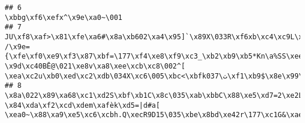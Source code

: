 \documentclass[
]{article}
\begin{document}
\begin{verbatim}
## 6                                                                                                                                                                                                                                                                                                                                                                                                                                                                                                                                                                                                                                                                                                                                                                                                                                                                                \xbbg\xf6\xefx^\x9e\xa0~\001
## 7                                                                                                                                                                                                                                                                                                              JU\xf8\xaf>\x81\xfe\xa6#\x8a\xb602\xa4\x95]`\x89X\033R\xf6xb\xc4\xc9L\xb6\xfc+\xa0\xd57 /\x9e={\xfe\xf0\xe9\xf3\x87\xbf=\177\xf4\xe8\xf9\xc3_\xb2\xb9\xb5*Kn\a%SS\xeeՏ_\xff\xfd\xfd\027\xde_\xbf\xfe\xf0\xea\xf17\xe9\xd4'\xf1\xc2Ŀ\xfc\xf9˗\xbf\xff\xf1:\xf5\xb0\xe2\xdc\025/\xbe}\xf2\xf2\xe9\x93\027\xdf}\xf5\xe7O\x8f\035\xda\xdb\034\035\x98\xf0!\x89\xb1\xf0\xae\xe1c\xef&\x8ba\x81\016\xfb\xf1\001?\x9d\xc40BĒ@\021\xe8v\xa8\xee\xcb\xc8\002^[ \xea\xc2u\xb0\xed\xc2\xdb\034X\xc6\005\xbc<\xbfkٺ\037\xf1\xb9$\x8e\x99\xafF\xb1\005\xdcc\x8cv\030w:ચ\xcb\xf0\xf0p\x9eLݓ󹉻\x89Бk\xee.J\xac
## 8                                                                                                                                                                                                                                                                                                                                                                                                                                                                                                                                                                                                                                       \x8a\022\x89\xa68\xc1\xd2S\xbf\xb1C\x8c\035\xab\xbbC\x88\xe5\xd7=2\xe2L\xb0\x89\xf4\xee\020\xaf\x83\x88\xd3%Cr`%R.\xb4Cb\x88\xcb\xc2e \x84\xda\xf2\xcd\xdem\xafèk\xd5=|d#a[ \xea0~\x88\xa9\xe5\xc6\xcbh.Q\xecR9D15\035\xbe\x8bd\xe42r\177\xc1G&\xae/$Dz\x8a)\xf3\xfac

\end{verbatim}
\end{document}
